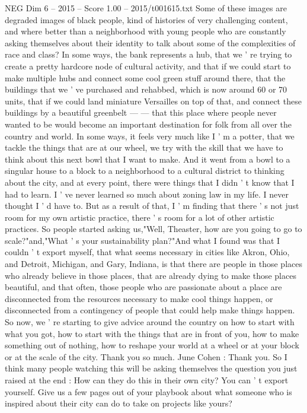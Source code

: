 \begin{textsample}{NEG Dim 6 – 2015 – Score 1.00 – 2015/t001615.txt}
Some of these images are degraded images of black people, kind of histories of very challenging content, and where better than a neighborhood with young people who are constantly asking themselves about their identity to talk about some of the complexities of race and class?
In some ways, the bank represents a hub, that we ' re trying to create a pretty hardcore node of cultural activity, and that if we could start to make multiple hubs and connect some cool green stuff around there, that the buildings that we ' ve purchased and rehabbed, which is now around 60 or 70 units, that if we could land miniature Versailles on top of that, and connect these buildings by a beautiful greenbelt — — that this place where people never wanted to be would become an important destination for folk from all over the country and world.
In some ways, it feels very much like I ' m a potter, that we tackle the things that are at our wheel, we try with the skill that we have to think about this next bowl that I want to make.
And it went from a bowl to a singular house to a block to a neighborhood to a cultural district to thinking about the city, and at every point, there were things that I didn ' t know that I had to learn.
I ' ve never learned so much about zoning law in my life.
I never thought I ' d have to.
But as a result of that, I ' m finding that there ' s not just room for my own artistic practice, there ' s room for a lot of other artistic practices.
So people started asking us,"Well, Theaster, how are you going to go to scale?"and,"What ' s your sustainability plan?"And what I found was that I couldn ' t export myself, that what seems necessary in cities like Akron, Ohio, and Detroit, Michigan, and Gary, Indiana, is that there are people in those places who already believe in those places, that are already dying to make those places beautiful, and that often, those people who are passionate about a place are disconnected from the resources necessary to make cool things happen, or disconnected from a contingency of people that could help make things happen.
So now, we ' re starting to give advice around the country on how to start with what you got, how to start with the things that are in front of you, how to make something out of nothing, how to reshape your world at a wheel or at your block or at the scale of the city.
Thank you so much.
June Cohen : Thank you.
So I think many people watching this will be asking themselves the question you just raised at the end : How can they do this in their own city?
You can ' t export yourself.
Give us a few pages out of your playbook about what someone who is inspired about their city can do to take on projects like yours?

\end{textsample}

